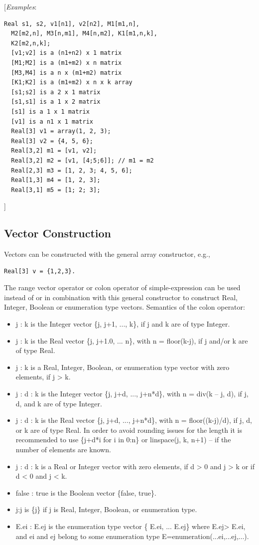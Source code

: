 \documentclass[10pt,a4paper]{report}
\def\doublelabel#1{\label{#1}\hypertarget{#1}{}}
\begin{document}
{[}\emph{Examples}:

\begin{lstlisting}[language=modelica]
  Real s1, s2, v1[n1], v2[n2], M1[m1,n],
  M2[m2,n], M3[n,m1], M4[n,m2], K1[m1,n,k],
  K2[m2,n,k];
  [v1;v2] is a (n1+n2) x 1 matrix
  [M1;M2] is a (m1+m2) x n matrix
  [M3,M4] is a n x (m1+m2) matrix
  [K1;K2] is a (m1+m2) x n x k array
  [s1;s2] is a 2 x 1 matrix
  [s1,s1] is a 1 x 2 matrix
  [s1] is a 1 x 1 matrix
  [v1] is a n1 x 1 matrix
  Real[3] v1 = array(1, 2, 3);
  Real[3] v2 = {4, 5, 6};
  Real[3,2] m1 = [v1, v2];
  Real[3,2] m2 = [v1, [4;5;6]]; // m1 = m2
  Real[2,3] m3 = [1, 2, 3; 4, 5, 6];
  Real[1,3] m4 = [1, 2, 3];
  Real[3,1] m5 = [1; 2; 3];
\end{lstlisting}
{]}

\subsection{Vector Construction}\doublelabel{vector-construction}

Vectors can be constructed with the general array constructor, e.g.,
\begin{lstlisting}[language=modelica]
  Real[3] v = {1,2,3}.
\end{lstlisting}
The range vector operator or colon operator of simple-expression can be
used instead of or in combination with this general constructor to
construct Real, Integer, Boolean or enumeration type vectors. Semantics
of the colon operator:

\begin{itemize}
\item
  j : k is the Integer vector \{j, j+1, ..., k\}, if j and k are of type
  Integer.
\item
  j : k is the Real vector \{j, j+1.0, ... n\}, with n = floor(k-j), if
  j and/or k are of type Real.
\item
  j : k is a Real, Integer, Boolean, or enumeration type vector with
  zero elements, if j \textgreater{} k.
\item
  j : d : k is the Integer vector \{j, j+d, ..., j+n*d\}, with n = div(k
  -- j, d), if j, d, and k are of type Integer.
\item
  j : d : k is the Real vector \{j, j+d, ..., j+n*d\}, with n =
  floor((k-j)/d), if j, d, or k are of type Real. In order to avoid
  rounding issues for the length it is recommended to use \{j+d*i for i
  in 0:n\} or linspace(j, k, n+1) -- if the number of elements are
  known.
\item
  j : d : k is a Real or Integer vector with zero elements, if d
  \textgreater{} 0 and j \textgreater{} k or if d \textless{} 0 and j
  \textless{} k.
\item
  false : true is the Boolean vector \{false, true\}.
\item
  j:j is \{j\} if j is Real, Integer, Boolean, or enumeration type.
\item
  E.ei : E.ej is the enumeration type vector \{ E.ei, ... E.ej\} where
  E.ej\textgreater{} E.ei, and ei and ej belong to some enumeration type
  E=enumeration(...ei,...ej,...).
\end{itemize}
\end{document}
